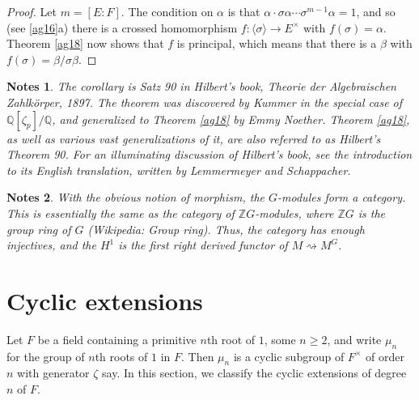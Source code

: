 \documentclass[a4paper,11pt,final,openany]{memoir}
\newtheorem*{nt}{Notes}
\theoremstyle{nonumberplain}
\newtheorem{proof}{Proof.}
\begin{document}
\begin{proof}
Let $m=[E\colon F]$. The condition on $\alpha$ is that $\alpha\cdot
\sigma\alpha\cdots\sigma^{m-1}\alpha=1$, and so (see \ref{ag16}a) there is a
crossed homomorphism $f\colon\langle\sigma\rangle\rightarrow E^{\times}$ with
$f(\sigma)=\alpha$. Theorem \ref{ag18} now shows that $f$ is principal, which
means that there is a $\beta$ with $f(\sigma)=\beta/\sigma\beta.$
\end{proof}

\begin{nt}
The corollary is Satz 90 in Hilbert's book, Theorie der Algebraischen
Zahlk\"{o}rper, 1897. The theorem was discovered by Kummer in the special case
of $\mathbb{Q}{}[\zeta_{p}]/\mathbb{Q}{}$, and generalized to Theorem
\ref{ag18} by Emmy Noether. Theorem \ref{ag18}, as well as various vast
generalizations of it, are also referred to as Hilbert's Theorem 90. For an
illuminating discussion of Hilbert's book, see the introduction to its English
translation, written by Lemmermeyer and Schappacher.
\end{nt}

\begin{nt}
With the obvious notion of morphism, the $G$-modules form a category. This is
essentially the same as the category of $\mathbb{Z}G$-modules, where
$\mathbb{Z}G$ is the group ring of $G$ (Wikipedia: Group ring). Thus, the
category has enough injectives, and the $H^{1}$ is the first right derived
functor of $M\rightsquigarrow M^{G}$.
\end{nt}

\section{Cyclic extensions}

Let $F$ be a field containing a primitive $n$th root of $1$, some $n\geq2$,
and write $\mu_{n}$ for the group of $n$th roots of $1$ in $F$. Then $\mu_{n}$
is a cyclic subgroup of $F^{\times}$ of order $n$ with generator $\zeta$ say.
In this section, we classify the cyclic extensions of degree $n$ of $F$.
\end{document}
